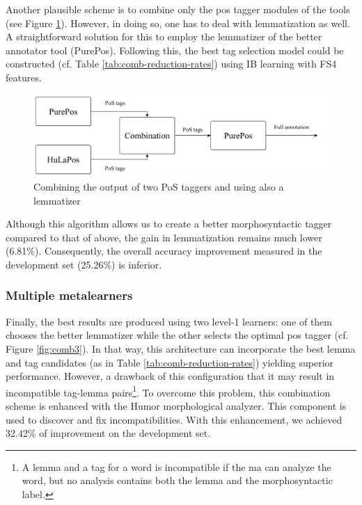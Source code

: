Another plausible scheme is to combine only the \acrshort{pos} tagger modules of the tools (see Figure \ref{fig:comb2}).
However, in doing so, one has to deal with lemmatization as well.
A straightforward solution for this to employ the lemmatizer of the better annotator tool (PurePos).
Following this, the best tag selection model could be constructed (cf.
Table \ref{tab:comb-reduction-rates}) using IB learning with FS4 features.

\begin{figure}[H]
  \centering
  \includegraphics[scale=0.2]{MorphTagging/comb2.png} 
  \caption{Combining the output of two PoS taggers and using also a lemmatizer}
  \label{fig:comb2}
\end{figure}

Although this algorithm allows us to create a better morphosyntactic tagger compared to that of above, the gain in lemmatization remains much lower (6.81\%).
Consequently, the overall accuracy improvement measured in the development set (25.26\%) is inferior.

\subsubsection{Multiple metalearners}

Finally, the best results are produced using two level-1 learners: one of them chooses the better lemmatizer while the other selects the optimal \acrshort{pos} tagger (cf. Figure \ref{fig:comb3}).
In that  way, this architecture can incorporate the best lemma and tag candidates (as in Table \ref{tab:comb-reduction-rates}) yielding superior performance.
However, a drawback of this configuration that it may result in incompatible tag-lemma pairs\footnote{A lemma and a tag for a word is incompatible if the \acrshort{ma} can analyze the word, but no analysis contains both the lemma and the morphosyntactic label.}.
To overcome this problem, this combination scheme is enhanced with the Humor morphological analyzer.
This component is used to discover and fix incompatibilities.
With this enhancement, we achieved  32.42\% of improvement on the development set.

